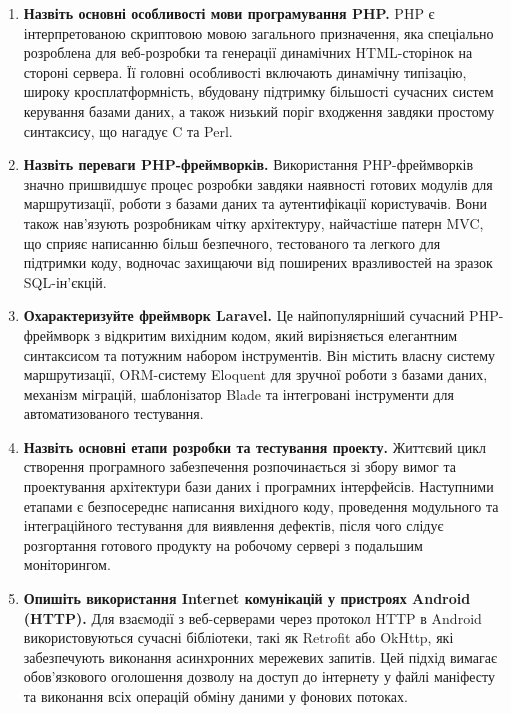 \documentclass[14pt, a4paper]{extreport}
\begin{document}
	\begin{enumerate}
		\item \textbf{Назвіть основні особливості мови програмування PHP.} PHP є інтерпретованою скриптовою мовою загального призначення, яка спеціально розроблена для веб-розробки та генерації динамічних HTML-сторінок на стороні сервера. Її головні особливості включають динамічну типізацію, широку кросплатформність, вбудовану підтримку більшості сучасних систем керування базами даних, а також низький поріг входження завдяки простому синтаксису, що нагадує C та Perl.
		
		\item \textbf{Назвіть переваги PHP-фреймворків.} Використання PHP-фреймворків значно пришвидшує процес розробки завдяки наявності готових модулів для маршрутизації, роботи з базами даних та аутентифікації користувачів. Вони також нав'язують розробникам чітку архітектуру, найчастіше патерн MVC, що сприяє написанню більш безпечного, тестованого та легкого для підтримки коду, водночас захищаючи від поширених вразливостей на зразок SQL-ін'єкцій.
		
		\item \textbf{Охарактеризуйте фреймворк Laravel.} Це найпопулярніший сучасний PHP-фреймворк з відкритим вихідним кодом, який вирізняється елегантним синтаксисом та потужним набором інструментів. Він містить власну систему маршрутизації, ORM-систему Eloquent для зручної роботи з базами даних, механізм міграцій, шаблонізатор Blade та інтегровані інструменти для автоматизованого тестування.
		
		\item \textbf{Назвіть основні етапи розробки та тестування проекту.} Життєвий цикл створення програмного забезпечення розпочинається зі збору вимог та проектування архітектури бази даних і програмних інтерфейсів. Наступними етапами є безпосереднє написання вихідного коду, проведення модульного та інтеграційного тестування для виявлення дефектів, після чого слідує розгортання готового продукту на робочому сервері з подальшим моніторингом.
		
		\item \textbf{Опишіть використання Internet комунікацій у пристроях Android (HTTP).} Для взаємодії з веб-серверами через протокол HTTP в Android використовуються сучасні бібліотеки, такі як Retrofit або OkHttp, які забезпечують виконання асинхронних мережевих запитів. Цей підхід вимагає обов'язкового оголошення дозволу на доступ до інтернету у файлі маніфесту та виконання всіх операцій обміну даними у фонових потоках.
		

\end{enumerate}
\end{document}
